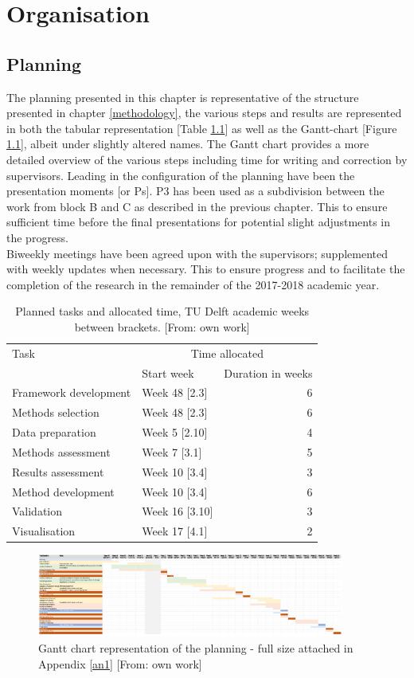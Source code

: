 \chapter{Organisation} \label{organisation}
\section{Planning} \label{planning}
The planning presented in this chapter is representative of the structure presented in chapter \ref{methodology}, the various steps and results are represented in both the tabular representation [Table \ref{tab:time}] as well as the Gantt-chart [Figure \ref{fig:gantt}], albeit under slightly altered names. The Gantt chart provides a more detailed overview of the various steps including time for writing and correction by supervisors. Leading in the configuration of the planning have been the presentation moments [or Ps]. P3 has been used as a subdivision between the work from block B and C as described in the previous chapter. This to ensure sufficient time before the final presentations for potential slight adjustments in the progress. \\
Biweekly meetings have been agreed upon with the supervisors; supplemented with weekly updates when necessary. This to ensure progress and to facilitate the completion of the research in the remainder of the 2017-2018 academic year. 

\begin{table}[h]
	\centering
\begin{tabular}{llr}
	\toprule
	Task & \multicolumn{2}{c}{Time allocated} \\
	\cmidrule{2-3}
	& Start week & Duration in weeks \\
	\midrule
	Framework development		& Week 48 \hfill [2.3]   & 6   \\
	Methods selection			& Week 48 \hfill [2.3]   & 6   \\
	Data preparation			& Week 5  \hfill [2.10]   & 4  \\
	Methods assessment			& Week 7 \hfill  [3.1]    & 5   \\
	Results assessment			& Week 10 \hfill [3.4]   & 3   \\
	Method development			& Week 10 \hfill [3.4]   & 6   \\
	Validation					& Week 16 \hfill [3.10]   & 3   \\
	Visualisation				& Week 17 \hfill [4.1]   & 2   \\
	\bottomrule
\end{tabular}
	\caption{Planned tasks and allocated time, TU Delft academic weeks between brackets. [From: own work]}
	\label{tab:time}
\end{table}

\begin{figure}[h]
	\centering
	\includegraphics[width=0.9\textwidth]{figs/gantt.png}
	\caption{Gantt chart representation of the planning - full size attached in Appendix \ref{an1} [From: own work]}
	\label{fig:gantt}
\end{figure}
